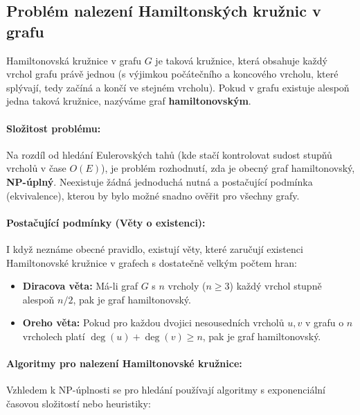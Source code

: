\subsection{Problém nalezení Hamiltonských kružnic v grafu}
Hamiltonovská kružnice v grafu $G$ je taková kružnice, která obsahuje každý vrchol grafu právě jednou (s výjimkou počátečního a koncového vrcholu, které splývají, tedy začíná a končí ve stejném vrcholu). Pokud v grafu existuje alespoň jedna taková kružnice, nazýváme graf \textbf{hamiltonovským}.

\paragraph*{Složitost problému:}
Na rozdíl od hledání Eulerovských tahů (kde stačí kontrolovat sudost stupňů vrcholů v čase $O(E)$), je problém rozhodnutí, zda je obecný graf hamiltonovský, \textbf{NP-úplný}. Neexistuje žádná jednoduchá nutná a postačující podmínka (ekvivalence), kterou by bylo možné snadno ověřit pro všechny grafy.

\paragraph*{Postačující podmínky (Věty o existenci):}
I když neznáme obecné pravidlo, existují věty, které zaručují existenci Hamiltonovské kružnice v grafech s dostatečně velkým počtem hran:
\begin{itemize}
    \item \textbf{Diracova věta:} Má-li graf $G$ s $n$ vrcholy ($n \geq 3$) každý vrchol stupně alespoň $n/2$, pak je graf hamiltonovský.
    \item \textbf{Oreho věta:} Pokud pro každou dvojici nesousedních vrcholů $u, v$ v grafu o $n$ vrcholech platí $\deg(u) + \deg(v) \geq n$, pak je graf hamiltonovský.
\end{itemize}

\paragraph*{Algoritmy pro nalezení Hamiltonovské kružnice:}
Vzhledem k NP-úplnosti se pro hledání používají algoritmy s exponenciální časovou složitostí nebo heuristiky:

